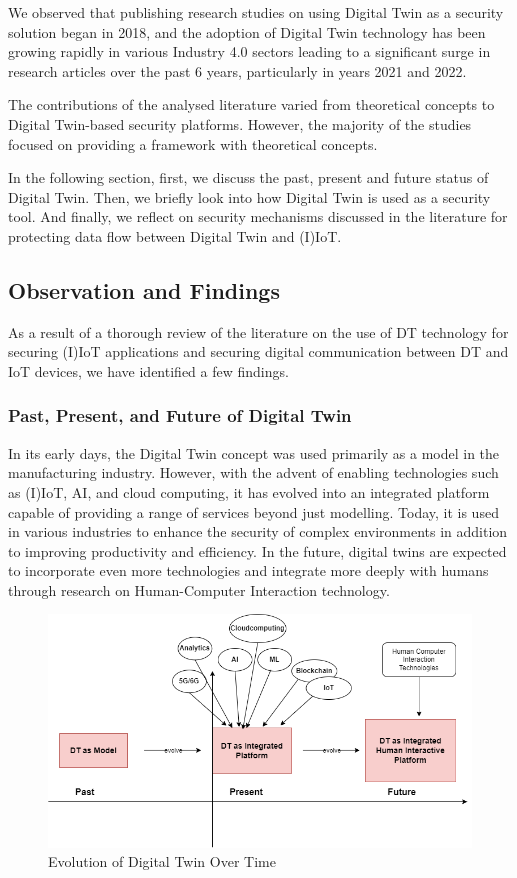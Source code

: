 We observed that publishing research studies on using Digital Twin as a security solution began in 2018, and the adoption of Digital Twin technology has been growing rapidly in various Industry 4.0 sectors leading to a significant surge in research articles over the past 6 years, particularly in years 2021 and 2022.

The contributions of the analysed literature varied from theoretical concepts to Digital Twin-based security platforms. However, the majority of the studies focused on providing a framework with theoretical concepts.


In the following section, first, we discuss the past, present and future status of Digital Twin. Then, we briefly look into how Digital Twin is used as a security tool. And finally, we reflect on security mechanisms discussed in the literature for protecting data flow between Digital Twin and (I)IoT.


\subsection{Observation and Findings}
As a result of a thorough review of the literature on the use of DT technology for securing (I)IoT applications and securing digital communication between DT and IoT devices, we have identified a few findings.


\subsubsection*{Past, Present, and Future of Digital Twin}
In its early days, the Digital Twin concept was used primarily as a model in the manufacturing industry. However, with the advent of enabling technologies such as (I)IoT, AI, and cloud computing, it has evolved into an integrated platform capable of providing a range of services beyond just modelling. Today, it is used in various industries to enhance the security of complex environments in addition to improving productivity and efficiency. In the future, digital twins are expected to incorporate even more technologies and integrate more deeply with humans through research on Human-Computer Interaction technology. 

\begin{figure}[H]
    \centering
    \includegraphics[width=\textwidth]{images/rt/dt-evolution.drawio.png}
    \caption{Evolution of Digital Twin Over Time}
    \label{fig:dt-evol}
\end{figure}


